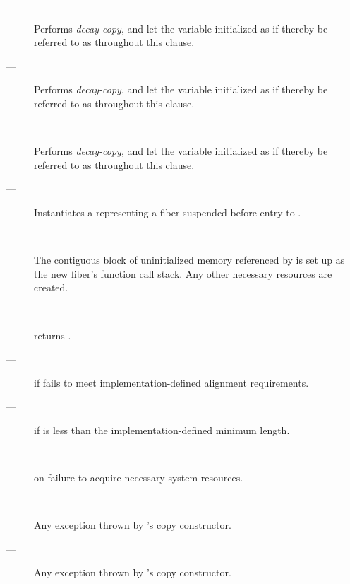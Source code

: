\effects
\begin{description}
    \item[---] Performs \emph{decay-copy}, and let the variable initialized as if thereby be referred to as  throughout this clause.
    \item[---] Performs \emph{decay-copy}, and let the variable initialized as if thereby be referred to as  throughout this clause.
    \item[---] Performs \emph{decay-copy}, and let the variable initialized as if thereby be referred to as  throughout this clause.
    \item[---] Instantiates a \fiber representing a fiber suspended before
              entry to .
    \item[---] The contiguous block of uninitialized memory referenced
              by  is set up as the new fiber's function call stack.
              Any other necessary resources are created.
\end{description}

\postcond
\begin{description}
    \item[---] \emptyfn returns \false.
\end{description}

\except
\begin{description}
    \item[---]  if  fails to meet
               implementation-defined alignment requirements.
    \item[---]  if  is less than the
               implementation-defined minimum length.
    \item[---]  on failure to acquire necessary system
               resources.
    \item[---] Any exception thrown by 's copy constructor.
    \item[---] Any exception thrown by 's copy constructor.
\end{description}

